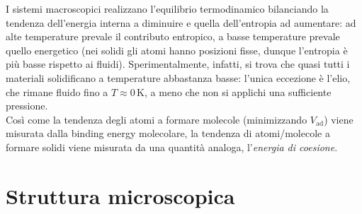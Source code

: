 
I sistemi macroscopici realizzano l'equilibrio termodinamico bilanciando la tendenza dell'energia interna a diminuire e quella dell'entropia ad aumentare: ad alte temperature prevale il contributo entropico, a basse temperature prevale quello energetico (nei solidi gli atomi hanno posizioni fisse, dunque l'entropia è più basse rispetto ai fluidi). Sperimentalmente, infatti, si trova che quasi tutti i materiali solidificano a temperature abbastanza basse: l'unica eccezione è l'elio, che rimane fluido fino a $ T \approx 0 \,\text{K} $, a meno che non si applichi una sufficiente pressione. \\
Così come la tendenza degli atomi a formare molecole (minimizzando $ V_\text{ad} $) viene misurata dalla binding energy molecolare, la tendenza di atomi/molecole a formare solidi viene misurata da una quantità analoga, l'\textit{energia di coesione}.

\section{Struttura microscopica}

